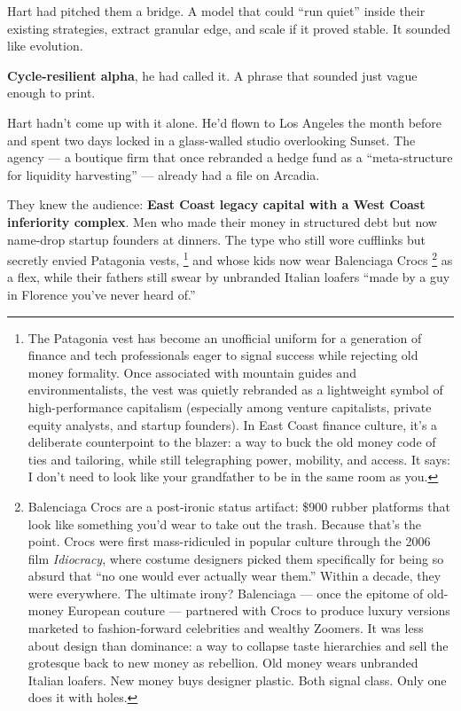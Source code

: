 \medskip


Hart had pitched them a bridge.
A model that could ``run quiet'' inside their existing strategies, extract granular edge, and scale if it proved stable.
It sounded like evolution.

\textbf{Cycle-resilient alpha}, he had called it.
A phrase that sounded just vague enough to print.

Hart hadn’t come up with it alone.
He’d flown to Los Angeles the month before and spent two days locked in a glass-walled studio overlooking Sunset.
The agency — a boutique firm that once rebranded a hedge fund as a “meta-structure for liquidity harvesting” — already had a file on Arcadia.

They knew the audience: \textbf{East Coast legacy capital with a West Coast inferiority complex}.
Men who made their money in structured debt but now name-drop startup founders at dinners.
The type who still wore cufflinks but secretly envied Patagonia vests,
\footnote{The Patagonia vest has become an unofficial uniform for a generation of finance and tech professionals eager to 
signal success while rejecting old money formality. Once associated with mountain guides and environmentalists, the vest was 
quietly rebranded as a lightweight symbol of high-performance capitalism (especially among venture capitalists, private equity 
analysts, and startup founders). In East Coast finance culture, it’s a deliberate counterpoint to the blazer: a way to buck the 
old money code of ties and tailoring, while still telegraphing power, mobility, and access. It says: I don’t need to look like 
your grandfather to be in the same room as you.} 
and whose kids now wear Balenciaga Crocs
\footnote{Balenciaga Crocs are a post-ironic status artifact: \$900 rubber platforms that look like something you'd wear to 
take out the trash. Because that’s the point. Crocs were first mass-ridiculed in popular culture through the 2006 film 
\textit{Idiocracy}, where costume designers picked them specifically for being so absurd that “no one would ever actually wear 
them.” Within a decade, they were everywhere. The ultimate irony? Balenciaga — once the epitome of old-money European couture 
— partnered with Crocs to produce luxury versions marketed to fashion-forward celebrities and wealthy Zoomers. It was less
 about design than dominance: a way to collapse taste hierarchies and sell the grotesque back to new money as rebellion. 
 Old money wears unbranded Italian loafers. New money buys designer plastic. Both signal class. Only one does it with holes.}
 as a flex, while their fathers still swear by unbranded Italian loafers 
``made by a guy in Florence you’ve never heard of.''

